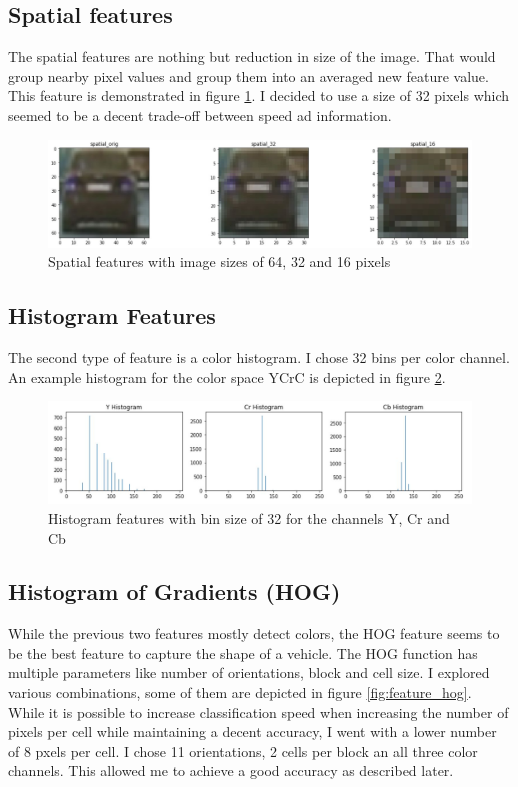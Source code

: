 \documentclass[a4paper, 11pt, DIV=14]{scrartcl}
\begin{document}
\subsection{Spatial features}
The spatial features are nothing but reduction in size of the image. That would group nearby pixel values and group them into an averaged new feature value. This feature is demonstrated in figure  \ref{fig:feature_spatial}. I decided to use a size of 32 pixels which seemed to be a decent trade-off between speed ad information.

\begin{figure}[h]
    \centering
    \includegraphics[width=\textwidth]{output_images/feature_spatial.jpg}
        \caption{Spatial features with image sizes of 64, 32 and 16 pixels}
    \label{fig:feature_spatial}
\end{figure}

\subsection{Histogram Features}
The second type of feature is a color histogram. I chose 32 bins per color channel. An example histogram for the color space YCrC is depicted in figure \ref{fig:feature_histogram}.

\begin{figure}[h]
    \centering
    \includegraphics[width=\textwidth]{output_images/feature_histogram.jpg}
        \caption{Histogram features with bin size of 32 for the channels Y, Cr and Cb}
    \label{fig:feature_histogram}
\end{figure}


\subsection{Histogram of Gradients (HOG)}
While the previous two features mostly detect colors, the HOG feature seems to be the best feature to capture the shape of a vehicle. The HOG function has multiple parameters like number of orientations, block and cell size. I explored various combinations, some of them are depicted in figure \ref{fig:feature_hog}. While it is possible to increase classification speed when increasing the number of pixels per cell while maintaining a decent accuracy, I went with a lower number of 8 pxels per cell. I chose 11 orientations, 2 cells per block an all three color channels. This allowed me to achieve a good accuracy as described later.
\end{document}
